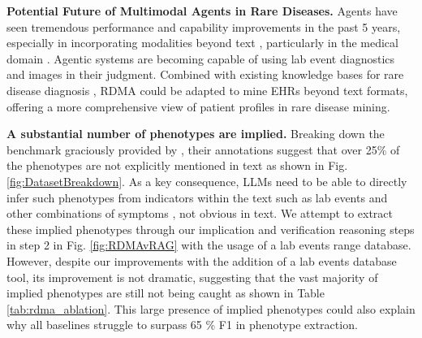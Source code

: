 \textbf{Potential Future of Multimodal Agents in Rare Diseases.} Agents have seen tremendous performance and capability improvements in the past 5 years, especially in incorporating modalities beyond text \cite{wang2024survey_agents}, particularly in the medical domain \cite{sviridov20253mdbenchagent,schmidgall2024agentclinic}. Agentic systems are becoming capable of using lab event diagnostics \cite{wu2024instruction_tuning_multimodal} and images \cite{xia2024cares_medical_vision_language_models} in their judgment. Combined with existing knowledge bases for rare disease diagnosis \cite{nelson2002unified_UMLS}, RDMA could be adapted to mine EHRs beyond text formats, offering a more comprehensive view of patient profiles in rare disease mining.




 \label{sec: challenges in mining}

\textbf{A substantial number of phenotypes are implied.} Breaking down the benchmark graciously provided by \cite{garcia2024_HPORAG}, their annotations suggest that over 25\% of the phenotypes are not explicitly mentioned in text as shown in Fig. \ref{fig:DatasetBreakdown}. As a key consequence, LLMs need to be able to directly infer such phenotypes from indicators within the text such as lab events and other combinations of symptoms \cite{wei2015extracting_survey_phenotypes}, not obvious in text. We attempt to extract these implied phenotypes through our implication and verification reasoning steps in step 2 in Fig. \ref{fig:RDMAvRAG} with the usage of a lab events range database. However, despite our improvements with the addition of a lab events database tool, its improvement is not dramatic, suggesting that the vast majority of implied phenotypes are still not being caught as shown in Table \ref{tab:rdma_ablation}. This large presence of implied phenotypes could also explain why all baselines struggle to surpass 65 \% F1 in phenotype extraction.

